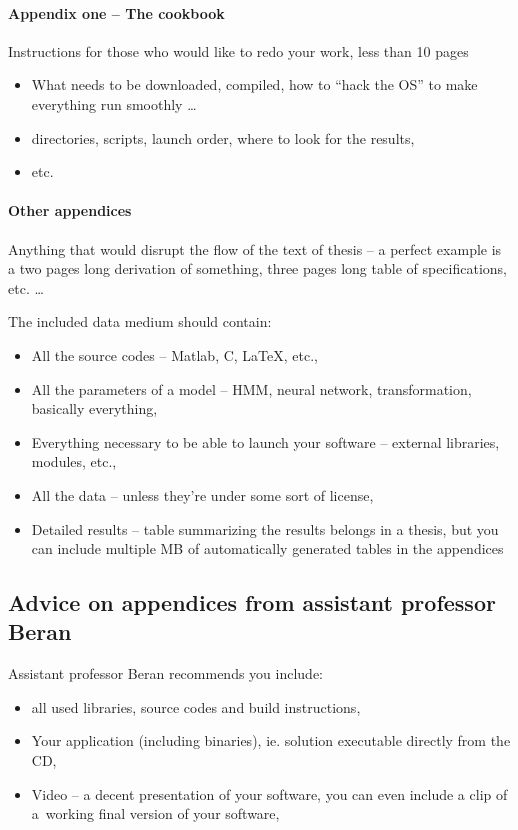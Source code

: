 {{\paragraph{Appendix one -- The cookbook}

Instructions for those who would like to redo your work, less than 10 pages
\begin{itemize}
  \item{What needs to be downloaded, compiled, how to ``hack the OS'' to make everything run smoothly \ldots}
  \item{directories, scripts, launch order, where to look for the results,}
  \item{etc.}
\end{itemize}

\paragraph{Other appendices}

Anything that would disrupt the flow of the text of thesis -- a perfect example is a two pages long derivation of something, three pages long table of specifications, etc. \ldots

The included data medium should contain:
\begin{itemize}
  \item{All the source codes -- Matlab, C, LaTeX, etc.,}
  \item{All the parameters of a model -- HMM, neural network, transformation, basically everything,}
  \item{Everything necessary to be able to launch your software -- external libraries, modules, etc.,}
  \item{All the data -- unless they're under some sort of license,}
  \item{Detailed results -- table summarizing the results belongs in a thesis, but you can include multiple MB of automatically generated tables in the appendices}
\end{itemize}

\subsection*{Advice on appendices from assistant professor Beran}

Assistant professor Beran recommends you include:
\begin{itemize}
  \item{all used libraries, source codes and build instructions,}
  \item{Your application (including binaries), ie. solution executable directly from the CD,}
  \item{Video -- a decent presentation of your software, you can even include a clip of a~working final version of your software,}
\end{itemize}

}}
